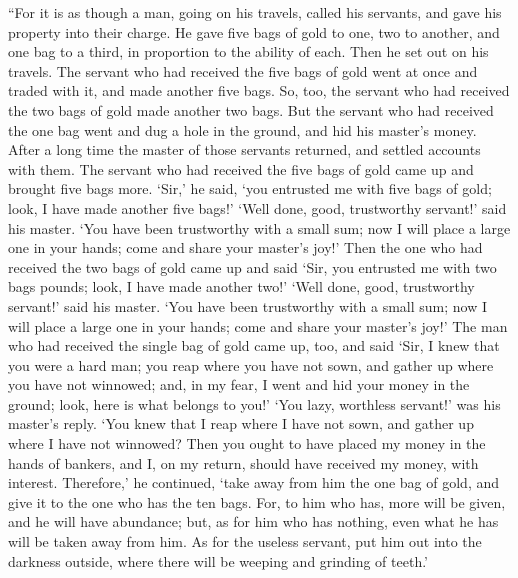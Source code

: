  ``For it is as though a man, going on his travels, called
his servants, and gave his property into their charge.  He
gave five bags of gold to one, two to another, and one bag to a third,
in proportion to the ability of each. Then he set out on his travels.
 The servant who had received the five bags of gold went at
once and traded with it, and made another five bags.  So,
too, the servant who had received the two bags of gold made another two
bags.  But the servant who had received the one bag went
and dug a hole in the ground, and hid his master's money. 
After a long time the master of those servants returned, and settled
accounts with them.  The servant who had received the five
bags of gold came up and brought five bags more. `Sir,' he said, `you
entrusted me with five bags of gold; look, I have made another five
bags!'  `Well done, good, trustworthy servant!' said his
master. `You have been trustworthy with a small sum; now I will place a
large one in your hands; come and share your master's joy!'
 Then the one who had received the two bags of gold came up
and said `Sir, you entrusted me with two bags pounds; look, I have made
another two!'  `Well done, good, trustworthy servant!' said
his master. `You have been trustworthy with a small sum; now I will
place a large one in your hands; come and share your master's joy!'
 The man who had received the single bag of gold came up,
too, and said `Sir, I knew that you were a hard man; you reap where you
have not sown, and gather up where you have not winnowed; 
and, in my fear, I went and hid your money in the ground; look, here is
what belongs to you!'  `You lazy, worthless servant!' was
his master's reply. `You knew that I reap where I have not sown, and
gather up where I have not winnowed?  Then you ought to
have placed my money in the hands of bankers, and I, on my return,
should have received my money, with interest.  Therefore,'
he continued, `take away from him the one bag of gold, and give it to
the one who has the ten bags.  For, to him who has, more
will be given, and he will have abundance; but, as for him who has
nothing, even what he has will be taken away from him.  As
for the useless servant, put him out into the darkness outside, where
there will be weeping and grinding of teeth.'

